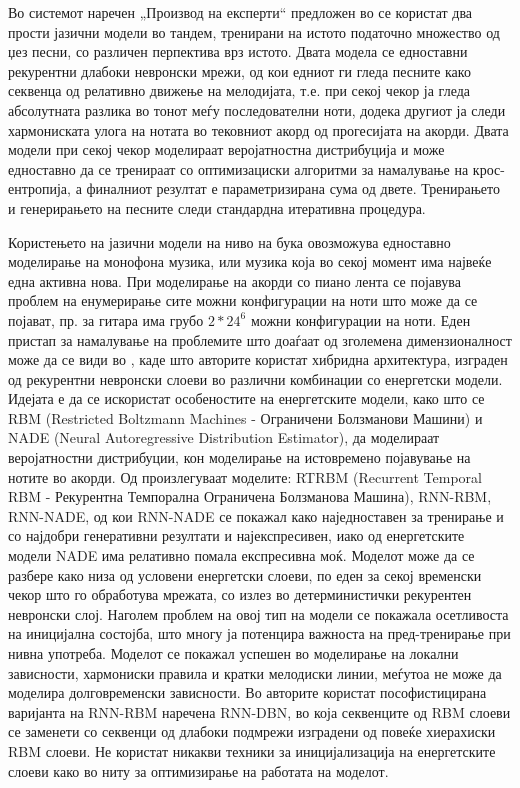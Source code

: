 Во системот наречен „Производ на експерти“ предложен во \cite{Johnson2017} се користат два прости јазични модели во тандем, тренирани на истото податочно множество од џез песни, со различен перпектива врз истото. Двата модела се едноставни рекурентни длабоки невронски мрежи, од кои едниот ги гледа песните како секвенца од релативно движење на мелодијата, т.е. при секој чекор ја гледа абсолутната разлика во тонот меѓу последователни ноти, додека другиот ја следи хармониската улога на нотата во тековниот акорд од прогесијата на акорди. Двата модели при секој чекор моделираат веројатностна дистрибуција и може едноставно да се тренираат со оптимизациски алгоритми за намалување на крос-ентропија, а финалниот резултат е параметризирана сума од двете. Тренирањето и генерирањето на песните следи стандардна итеративна процедура.

Користењето на јазични модели на ниво на бука овозможува едноставно моделирање на монофона музика, или музика која во секој момент има највеќе една активна нова. При моделирање на акорди со пиано лента се појавува проблем на енумерирање сите можни конфигурации на ноти што може да се појават, пр. за гитара има грубо $2*24^6$ можни конфигурации на ноти. Еден пристап за намалување на проблемите што доаѓаат од зголемена димензионалност може да се види во \cite{Boulanger-Lewandowski2012, Boulanger-Lewandowski2014, Goel2014}, каде што авторите користат хибридна архитектура, изграден од рекурентни невронски слоеви во различни комбинации со енергетски модели. Идејата е да се искористат особеностите на енергетските модели, како што се RBM (Restricted Boltzmann Machines - Ограничени Болзманови Машини) и NADE (Neural Autoregressive Distribution Estimator), да моделираат веројатностни дистрибуции, кон моделирање на истовремено појавување на нотите во акорди. Од \cite{Boulanger-Lewandowski2012, Boulanger-Lewandowski2014} произлегуваат моделите: RTRBM (Recurrent Temporal RBM - Рекурентна Темпорална Ограничена Болзманова Машина), RNN-RBM, RNN-NADE, од кои RNN-NADE се покажал како наједноставен за тренирање и со најдобри генеративни резултати и најекспресивен, иако од енергетските модели NADE има релативно помала експресивна моќ. Моделот може да се разбере како низа од условени енергетски слоеви, по еден за секој временски чекор што го обработува мрежата, со излез во детерминистички рекурентен невронски слој. Наголем проблем на овој тип на модели се покажала осетливоста на иницијална состојба, што многу ја потенцира важноста на пред-тренирање при нивна употреба. Моделот се покажал успешен во моделирање на локални зависности, хармониски правила и кратки мелодиски линии, меѓутоа не може да моделира долговременски зависности. Во \cite{Goel2014} авторите користат пософистицирана варијанта на RNN-RBM наречена RNN-DBN, во која секвенците од RBM слоеви се заменети со секвенци од длабоки подмрежи изградени од повеќе хиерахиски RBM слоеви. Не користат никакви техники за иницијализација на енергетските слоеви како во \cite{Boulanger-Lewandowski2012, Boulanger-Lewandowski2014, Goel2014} ниту за оптимизирање на работата на моделот.

